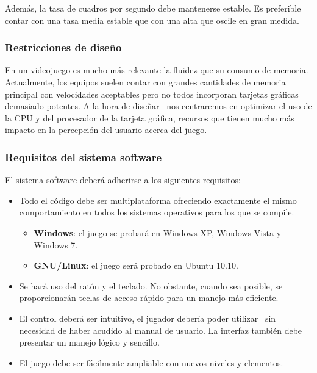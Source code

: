 Además, la tasa de cuadros por segundo debe mantenerse estable. Es preferible
contar con una tasa media estable que con una alta que oscile en gran medida.\\

\subsubsection{Restricciones de diseño}

En un videojuego es mucho más relevante la fluidez que su consumo de memoria.
Actualmente, los equipos suelen contar con grandes cantidades de memoria
principal con velocidades aceptables pero no todos incorporan tarjetas
gráficas demasiado potentes. A la hora de diseñar \juego\ nos centraremos
en optimizar el uso de la CPU y del procesador de la tarjeta gráfica, recursos
que tienen mucho más impacto en la percepción del usuario acerca del juego.\\

\subsubsection{Requisitos del sistema software}

El sistema software deberá adherirse a los siguientes requisitos:

\begin{itemize}
    \itemsep0em
    \item Todo el código debe ser multiplataforma ofreciendo exactamente
    el mismo comportamiento en todos los sistemas operativos para los
    que se compile.
    \begin{itemize}
        \item \textbf{Windows}: el juego se probará en Windows XP, Windows Vista y Windows 7.
        \item \textbf{GNU/Linux}: el juego será probado en Ubuntu 10.10.
    \end{itemize}
    \item Se hará uso del ratón y el teclado. No obstante, cuando sea posible,
    se proporcionarán teclas de acceso rápido para un manejo más eficiente.
    \item El control deberá ser intuitivo, el jugador debería poder utilizar
    \juego\ sin necesidad de haber acudido al manual de usuario. La interfaz
    también debe presentar un manejo lógico y sencillo.
    \item El juego debe ser fácilmente ampliable con nuevos niveles y elementos.
\end{itemize}

